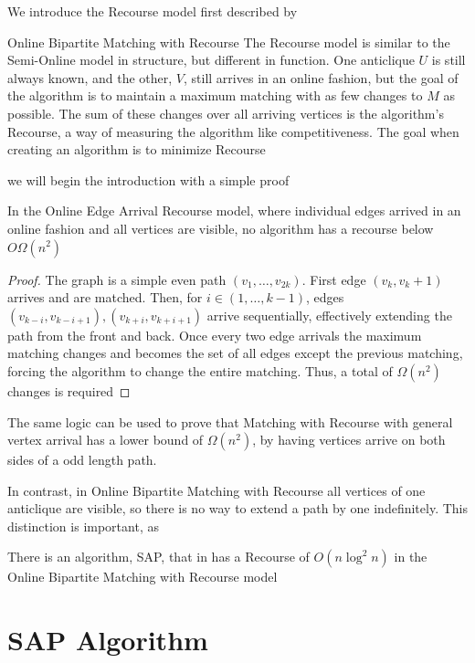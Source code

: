 We introduce the Recourse model first described by \cite{recourse-autohrs}
\begin{definition}{Online Bipartite Matching with Recourse}
	The Recourse model is similar to the Semi-Online model in structure, but different in function. One anticlique $U$ is still always known, and the other, $V$, still arrives in an online fashion, but the goal of the algorithm is to maintain a maximum matching with as few changes to $M$ as possible. The sum of these changes over all arriving vertices is the algorithm's Recourse, a way of measuring the algorithm like competitiveness. The goal when creating an algorithm is to minimize Recourse
\end{definition}

we will begin the introduction with a simple proof
\begin{remark}
	In the Online Edge Arrival Recourse model, where individual edges arrived in an online fashion and all vertices are visible, no algorithm has a recourse below $O\Omega(n^2)$
\end{remark}
\begin{proof}
	The graph is a simple even path $(v_1,\dots,v_{2k})$. First edge $(v_k,v_k+1)$ arrives and are matched. Then, for $i\in(1,\dots,k-1)$, edges $(v_{k-i},v_{k-i+1}),(v_{k+i},v_{k+i+1})$ arrive sequentially, effectively extending the path from the front and back. Once every two edge arrivals the maximum matching changes and becomes the set of all edges except the previous matching, forcing the algorithm to change the entire matching. Thus, a total of $\Omega(n^2)$ changes is required
\end{proof}
\begin{remark}
	The same logic can be used to prove that Matching with Recourse with general vertex arrival has a lower bound of $\Omega(n^2)$, by having vertices arrive on both sides of a odd length path.
\end{remark}
In contrast, in Online Bipartite Matching with Recourse all vertices of one anticlique are visible, so there is no way to extend a path by one indefinitely. This distinction is important, as
\begin{theorem}
	\label{thm:recourse}
	There is an algorithm, SAP, that in has a Recourse of $O(n \log^2 n)$ in the Online Bipartite Matching with Recourse model
\end{theorem}

\section{SAP Algorithm}
